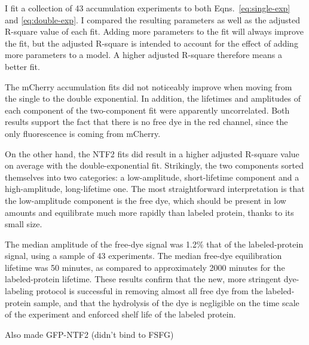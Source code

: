 I fit a collection of 43 accumulation experiments to both Eqns.~\ref{eq:single-exp} and \ref{eq:double-exp}.  I compared the resulting parameters as well as the adjusted R-square value of each fit.  Adding more parameters to the fit will always improve the fit, but the adjusted R-square is intended to account for the effect of adding more parameters to a model.  A higher adjusted R-square therefore means a better fit.

The mCherry accumulation fits did not noticeably improve when moving from the single to the double exponential.  In addition, the lifetimes and amplitudes of each component of the two-component fit were apparently uncorrelated.  Both results support the fact that there is no free dye in the red channel, since the only fluorescence is coming from mCherry.

On the other hand, the NTF2 fits did result in a higher adjusted R-square value on average with the double-exponential fit.  Strikingly, the two components sorted themselves into two categories: a low-amplitude, short-lifetime component and a high-amplitude, long-lifetime one.  The most straightforward interpretation is that the low-amplitude component is the free dye, which should be present in  low amounts and equilibrate much more rapidly than labeled protein, thanks to its small size.

The median amplitude of the free-dye signal was 1.2\% that of the labeled-protein signal, using a sample of 43 experiments.  The median free-dye equilibration lifetime was 50 minutes, as compared to approximately 2000 minutes for the labeled-protein lifetime.  These results confirm that the new, more stringent dye-labeling protocol is successful in removing almost all free dye from the labeled-protein sample, and that the hydrolysis of the dye is negligible on the time scale of the experiment and enforced shelf life of the labeled protein.

Also made GFP-NTF2 (didn’t bind to FSFG)


